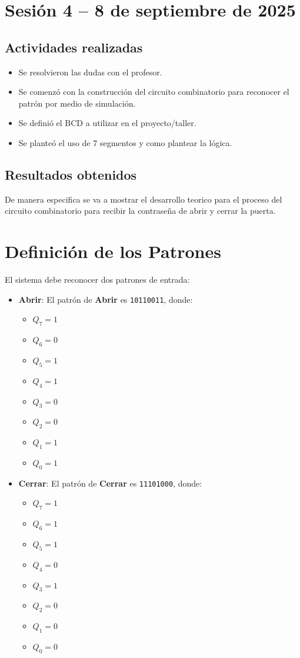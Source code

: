 \documentclass[12pt,letterpaper]{article}
\begin{document}
\section{Sesión 4 -- 8 de septiembre de 2025}
\subsection*{Actividades realizadas}
\begin{itemize}
    \item Se resolvieron las dudas con el profesor.
    \item Se comenzó con la construcción del circuito combinatorio para reconocer el patrón por medio de simulación.
    \item Se definió el BCD a utilizar en el proyecto/taller.
    \item Se planteó el uso de 7 segmentos y como plantear la lógica.
\end{itemize}

\subsection*{Resultados obtenidos}
De manera especifica se va a mostrar el desarrollo teorico para el proceso del circuito combinatorio para recibir la contraseña de abrir y cerrar la puerta.
\section*{Definición de los Patrones}
El sistema debe reconocer dos patrones de entrada:

\begin{itemize}
  \item \textbf{Abrir}: El patrón de \textbf{Abrir} es \texttt{10110011}, donde:
    \begin{itemize}
      \item $Q_7 = 1$
      \item $Q_6 = 0$
      \item $Q_5 = 1$
      \item $Q_4 = 1$
      \item $Q_3 = 0$
      \item $Q_2 = 0$
      \item $Q_1 = 1$
      \item $Q_0 = 1$
    \end{itemize}
  \item \textbf{Cerrar}: El patrón de \textbf{Cerrar} es \texttt{11101000}, donde:
    \begin{itemize}
      \item $Q_7 = 1$
      \item $Q_6 = 1$
      \item $Q_5 = 1$
      \item $Q_4 = 0$
      \item $Q_3 = 1$
      \item $Q_2 = 0$
      \item $Q_1 = 0$
      \item $Q_0 = 0$
    \end{itemize}
\end{itemize}
\end{document}
